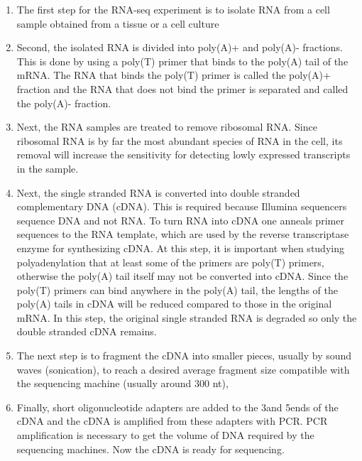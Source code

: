 \begin{enumerate}
	\item The first step for the RNA-seq experiment is to isolate RNA from a
		cell sample obtained from a tissue or a cell culture

	\item Second, the isolated RNA is divided into poly(A)+ and poly(A)-
		fractions. This is done by using a poly(T) primer that binds to the
		poly(A) tail of the mRNA. The RNA that binds the poly(T) primer is
		called the poly(A)+ fraction and the RNA that does not bind the primer
		is separated and called the poly(A)- fraction.

	\item Next, the RNA samples are treated to remove ribosomal RNA. Since
		ribosomal RNA is by far the most abundant species of RNA in the cell,
		its removal will increase the sensitivity for detecting lowly expressed
		transcripts in the sample.

	\item Next, the single stranded RNA is converted into double stranded
        complementary DNA (cDNA). This is required because Illumina sequencers
        sequence DNA and not RNA. To turn RNA into cDNA one anneals primer
        sequences to the RNA template, which are used by the reverse
        transcriptase enzyme for synthesizing cDNA. At this step, it is
        important when studying polyadenylation that at least some of the
        primers are poly(T) primers, otherwise the poly(A) tail itself may not
        be converted into cDNA. Since the poly(T) primers can bind anywhere in
        the poly(A) tail, the lengths of the poly(A) tails in cDNA will be
        reduced compared to those in the original mRNA. In this step, the
        original single stranded RNA is degraded so only the double stranded
        cDNA remains.

	\item The next step is to fragment the cDNA into smaller pieces, usually by
		sound waves (sonication), to reach a desired average fragment size
		compatible with the sequencing machine (usually around 300 nt),

	\item Finally, short oligonucleotide adapters are added to the 3\ppp and
		5\ppp ends of the cDNA and the cDNA is amplified from these adapters
		with PCR.  PCR amplification is necessary to get the volume of DNA
		required by the sequencing machines. Now the cDNA is ready for
		sequencing.

\end{enumerate}

